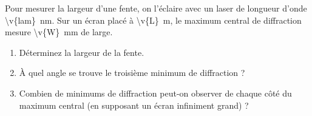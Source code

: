 Pour mesurer la largeur d'une fente, on l'éclaire avec un laser de longueur d'onde \qty{\v{lam}}{nm}. Sur un écran placé à \qty{\v{L}}{m}, le maximum central de diffraction mesure \qty{\v{W}}{mm} de large.

\begin{enumerate}[label=\alph*)]
    \item Déterminez la largeur de la fente.
    \item À quel angle se trouve le troisième minimum de diffraction ?
    \item Combien de minimums de diffraction peut-on observer de chaque côté du maximum central (en supposant un écran infiniment grand) ?
\end{enumerate}
